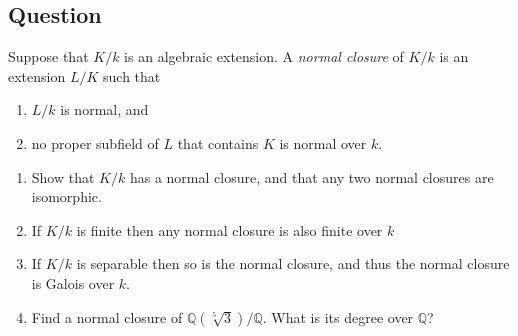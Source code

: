 \documentclass[11pt]{article}
\begin{document}
\subsection{Question}
Suppose that $K/k$ is an algebraic extension. A \emph{normal closure} of $K/k$ is an extension $L/K$ such that
\begin{enumerate}
\item $L/k$ is normal, and
\item no proper subfield of $L$ that contains $K$ is normal over $k$.
\end{enumerate}\begin{enumerate}
\item Show that $K/k$ has a normal closure, and that any two normal closures are isomorphic.
\item If $K/k$ is finite then any normal closure is also finite over $k$
\item If $K/k$ is separable then so is the normal closure, and thus the normal closure is Galois over $k$.
\item Find a normal closure of $\mathbb{Q}(\sqrt[5]{3})/\mathbb{Q}$. What is its degree over $\mathbb{Q}$?
\end{enumerate}
\end{document}
